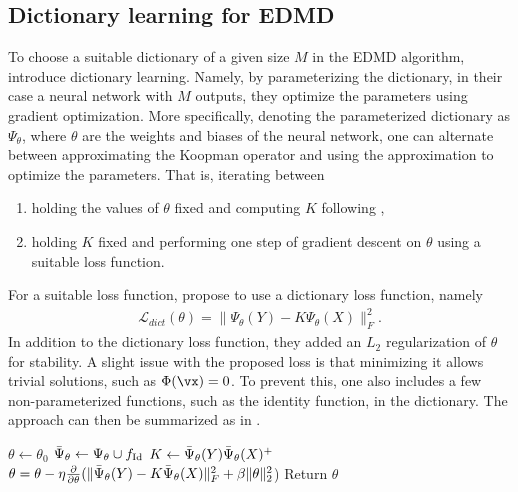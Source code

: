 \documentclass{article}
\begin{document}
\subsection{Dictionary learning for EDMD}\label{sec:dl_edmd}
To choose a suitable dictionary of a given size \(M\) in the EDMD algorithm, \citet{li-2017} introduce dictionary learning. Namely, by parameterizing the dictionary, in their case a neural network with \(M\) outputs, they optimize the parameters using gradient optimization. More specifically, denoting the parameterized dictionary as \(\Psi_{\theta}\), where \(\theta\) are the weights and biases of the neural network, one can alternate between approximating the Koopman operator and using the approximation to optimize the parameters. That is, iterating between 
\begin{enumerate}
    \item holding the values of \(\theta\) fixed and computing \(K\) following ,
    \item holding \(K\) fixed and performing one step of gradient descent on \(\theta\) using a suitable loss function.
\end{enumerate} 
For a suitable loss function, \citet{li-2017} propose to use a dictionary loss function, namely
\begin{align*}
    \mathcal{L}_{dict}(\theta) = \lVert \Psi_{\theta}(Y) - K \Psi_{\theta}(X)\rVert_F^2.
\end{align*}
In addition to the dictionary loss function, they added an \(L_2\) regularization of \(\theta\) for stability. A slight issue with the proposed loss is that minimizing it allows trivial solutions, such as \(\Phi(\vx) = 0\). To prevent this, one also includes a few non-parameterized functions, such as the identity function, in the dictionary. The approach can then be summarized as in .

\begin{minipage}{1.0\linewidth}
    \begin{algorithm}[H]
        \caption{Dictionary learning for EDMD, using a parameterized dictionary \(\Psi_{\theta}\). As input it takes snapshots from the dynamical system \((X,Y)\), initial parameter value \(\theta_0\), learning rate \(\eta >0\), regularization constant \(\beta>0\), and the number of epochs. We denote the identity function as \(f_{\text{Id}}\), i.e., \(f_{\text{Id}}(\vx)= \vx\).}\label{alg:dl_edmd}
        \begin{algorithmic}
            \State $\theta \leftarrow \theta_0$
            \State $\Bar{\Psi}_{\theta} \leftarrow \Psi_{\theta} \cup f_{\text{Id}}$
                \State $K \leftarrow \Bar{\Psi}_{\theta}(Y) \Bar{\Psi}_{\theta}(X)^+$
                \State $\theta = \theta - \eta \frac{\partial}{\partial \theta}(\lVert \Bar{\Psi}_{\theta}(Y)  - K \Bar{\Psi}_{\theta}(X)\rVert_F^2 + \beta\lVert \theta \rVert^2_2$)
            \EndFor
            \State Return $\theta$
            \EndProcedure
    \end{algorithmic}
    \end{algorithm}
\end{minipage}
\end{document}
